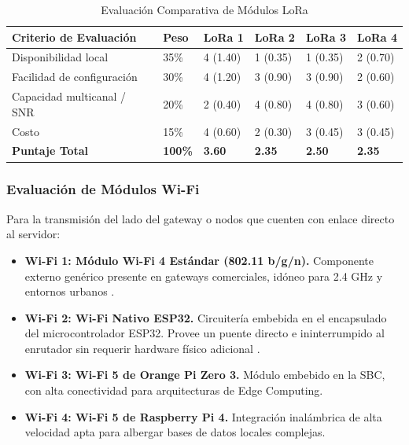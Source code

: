 \begin{table}[H]
    \centering
    \renewcommand{\arraystretch}{1.5}
    \caption{Evaluación Comparativa de Módulos LoRa}
    \label{tabla:evaluacion_lora}
    \begin{tabular}{|p{4.5cm}|p{1.5cm}|p{1.5cm}|p{1.5cm}|p{1.5cm}|p{1.5cm}|}
        \hline
        \textbf{Criterio de Evaluación} & \textbf{Peso}  & \textbf{LoRa 1} & \textbf{LoRa 2} & \textbf{LoRa 3} & \textbf{LoRa 4} \\ \hline
        Disponibilidad local            & 35\%           & 4 (1.40)        & 1 (0.35)        & 1 (0.35)        & 2 (0.70)        \\ \hline
        Facilidad de configuración      & 30\%           & 4 (1.20)        & 3 (0.90)        & 3 (0.90)        & 2 (0.60)        \\ \hline
        Capacidad multicanal / SNR      & 20\%           & 2 (0.40)        & 4 (0.80)        & 4 (0.80)        & 3 (0.60)        \\ \hline
        Costo                           & 15\%           & 4 (0.60)        & 2 (0.30)        & 3 (0.45)        & 3 (0.45)        \\ \hline
        \textbf{Puntaje Total}          & \textbf{100\%} & \textbf{3.60}   & \textbf{2.35}   & \textbf{2.50}   & \textbf{2.35}   \\ \hline
    \end{tabular}
\end{table}

\subsubsection{Evaluación de Módulos Wi-Fi}

Para la transmisión del lado del gateway o nodos que cuenten con enlace directo al servidor:
\begin{itemize}
    \item \textbf{Wi-Fi 1: Módulo Wi-Fi 4 Estándar (802.11 b/g/n).} Componente externo genérico presente en gateways comerciales, idóneo para 2.4 GHz y entornos urbanos \cite{nb_wifi_16}.
    \item \textbf{Wi-Fi 2: Wi-Fi Nativo ESP32.} Circuitería embebida en el encapsulado del microcontrolador ESP32. Provee un puente directo e ininterrumpido al enrutador sin requerir hardware físico adicional \cite{nb_mcu_4, nb_mcu_6}.
    \item \textbf{Wi-Fi 3: Wi-Fi 5 de Orange Pi Zero 3.} Módulo embebido en la SBC, con alta conectividad para arquitecturas de Edge Computing.
    \item \textbf{Wi-Fi 4: Wi-Fi 5 de Raspberry Pi 4.} Integración inalámbrica de alta velocidad apta para albergar bases de datos locales complejas.
\end{itemize}

